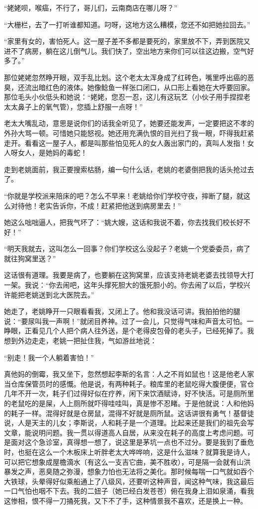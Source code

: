  “姥姥呗，喉癌，不行了，哥儿们，云南商店在哪儿呀？” 
 
 “大栅栏，去了一打听谁都知道。叼呀，这地方这么糟模，您还不如把她拉回去。” 
 
 “家里有女的，害怕死人。这一屋子差不多都是要死的，家里放不下，弄到医院又进不了病房，躺在这儿倒气儿。我们快了，空出地方来你们可以往这边搬，空气好多了。” 
 
 那位姥姥忽然睁开眼，双手乱比划。这个老太太浑身成了红砖色，嘴里呼出癌的恶臭，还流出暗红色的液体。她像鲶鱼一样张口闭口，从口形上看她在大呼要回家。那位毛头小伙低头和她说：“姥姥，您忍一忍，这儿有这玩艺（小伙子用手捏捏老太太鼻子上的氧气管），您插上舒服一点呀！” 
 
 老太大嘴乱动，意思是说你们的话我全听见了，她要还能发声，一定要把这不孝的外孙大骂一顿。可惜她只能怒视。她还用充满仇恨的目光扫了我一眼，吓得我赶紧走开。看看这一屋子人，都是叫那些怕见死人的女人轰出家门的，真叫人发指！女人呀女人，是她妈的毒蛇！ 
 
 走到老姚面前，我正要搜索枯肠，编一句什么话，老姚的老婆倒把我的话头抢过去了。 
 
 “你就是学校派来陪床的吧？怎么不早来！老姚给你们学校守夜，摔断了腿，就这么对待他！老实告诉你，不成！赶紧把他送到病房里去！” 
 
 她这么咄咄逼人，把我气坏了：“姚大嫂，这话和我说不着，你去找我们校长好不好！” 
 
 “明天我就去，这叫怎么一回事？你们学校这么没起子？老姚一个党委委员，病了就往狗窝里送？” 
 
 这话很有道理。我要是病了，也要躺在这狗窝里，应该支持老姚老婆去找领导大打一架。我说：“你去闹吧，这年头撑死胆大的饿死胆小的。你去闹了以后，学校兴许能把老姚送到北大医院去。” 
 
 她走了，老姚睁开一只眼看看我，又闭上了。他和我没话可讲。我拍拍他的腿说：“要尿叫我一声啊！”就闭目养神。过了一会儿，只觉得气味和声音太可怕。一睁眼，正看见几个人把个病人往外送，是个老得皮包骨的老头子，已经死掉了。我想到外边走走，老姚一把扯住我，气如游丝地说： 
 
 “别走！我一个人躺着害怕！” 
 
 真他妈的倒霉，我又坐下，忽然想起李斯的名言：人之不肖如鼠也！这是他老人家当仓库保管员时的感慨。他是说，有两种耗子。粮库里的老鼠吃得大腹便便，官仓几年不开一次，耗子们过得好似在疗养，闲下来饮酒赋诗，好不快活。可是厕所里的老鼠吃的是屎，人上厕所就吓得哇哇叫，真是惨不忍睹。于是他就说：人和他妈的耗子一样。混得好就是仓房鼠，混得不好就是厕所鼠。这话讲很有勇气！基督徒说，人是天主的儿女；李斯说，人和耗子是一个道理。比起来还是我们的祖先会写文章，能说明问题。我一贯以得道高人自居，从来没在耗子的高度上考虑问题。可是面对这个急诊室，真得想一想了，说这里是茅坑一点也不过分。要是我到了垂危时，也挺在这么一个木板床上听胖老太大哗哗响，这是什么滋味？就算我是诗人，可以把它想象成屋檐滴水〔有这么一支吉它曲，美不胜收），可是隔一会就有山洪暴发之声，恶臭随之弥漫，想象力怕也无法将之美化。那时候每喘一口气就如吞个大铁球，头晕得好似乘船通上了八级风，还要听这种声音，闻这种气味，我这最后一口气怕也咽不下去。我的二妞子（她已经白发苍苍）俯在我身上泪如泉涌，看我这惨相，恨不得一刀捅死我，又下不了手，这种情景我不喜欢，还是换上一种。 
 
